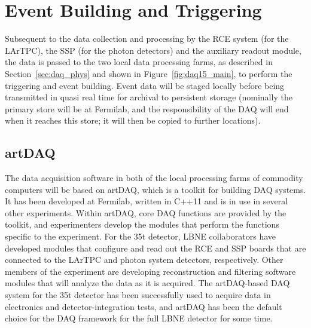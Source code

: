 \section{Event Building and Triggering}
\label{sec:daq_artDAQ}

Subsequent to the data collection and processing by the RCE system
(for the LArTPC), the SSP (for the photon detectors) and the
auxiliary readout module, the data is passed to the two local data
processing farms, as described in Section~\ref{sec:daq_phys} and shown
in Figure~\ref{fig:daq15_main}, to perform the triggering and event
building.  Event data will be staged locally before being transmitted
in quasi real time for archival to persistent storage (nominally the
primary store will be at Fermilab, and the responsibility of the DAQ
will end when it reaches this store; it will then be copied to further
locations).

\subsection{artDAQ}

The data acquisition software in both of the local processing farms of
commodity computers will be based on artDAQ, which is a toolkit for
building DAQ systems.  It has been developed at Fermilab, written in
C++11 and is in use in several other experiments.  Within artDAQ, core
DAQ functions are provided by the toolkit, and experimenters develop
the modules that perform the functions specific to the
experiment.  For the 35t detector, LBNE collaborators have
developed modules that configure and read out the RCE and SSP boards
that are connected to the LArTPC and photon system detectors,
respectively.  Other members of the experiment are %
developing
reconstruction and filtering software modules that will analyze the
data as it is acquired.  The artDAQ-based DAQ system for the 35t
detector has been successfully used to acquire data in electronics and
detector-integration tests, and artDAQ has been the default choice for
the DAQ framework for the full LBNE detector for some time.

